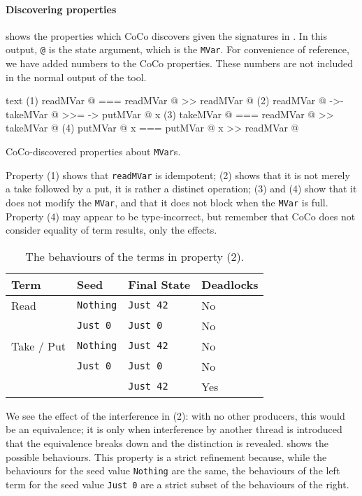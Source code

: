 \paragraph{Discovering properties}
 shows the properties which CoCo discovers given
the signatures in .  In this output, \verb|@| is the
state argument, which is the \verb|MVar|.  For convenience of
reference, we have added numbers to the CoCo properties.  These
numbers are not included in the normal output of the tool.

\begin{listing}
\centering
\begin{cminted}{text}
(1)   readMVar @  ===  readMVar @ >> readMVar @
(2)   readMVar @  ->-  takeMVar @ >>= \x -> putMVar @ x
(3)   takeMVar @  ===  readMVar @ >> takeMVar @
(4)  putMVar @ x  ===  putMVar @ x >> readMVar @
\end{cminted}
\caption{CoCo-discovered properties about \texttt{MVar}s.}\label{lst:mvar_props1}
\end{listing}

Property (1) shows that \verb|readMVar| is idempotent; (2) shows that
it is not merely a take followed by a put, it is rather a distinct
operation; (3) and (4) show that it does not modify the \verb|MVar|,
and that it does not block when the \verb|MVar| is full.  Property (4)
may appear to be type-incorrect, but remember that CoCo does not
consider equality of term results, only the effects.

\begin{table}[t]
\centering
\begin{tabular}{p{7.5em}p{7.5em}p{7.5em}p{7.5em}} \toprule
  Term       & Seed           & Final State & Deadlocks \\ \midrule
  Read       & \verb|Nothing| & \verb|Just 42| & No  \\
             & \verb|Just 0|  & \verb|Just 0|  & No  \\
  Take / Put & \verb|Nothing| & \verb|Just 42| & No  \\
             & \verb|Just 0|  & \verb|Just 0|  & No  \\
             &                & \verb|Just 42| & Yes \\ \bottomrule
\end{tabular}
\caption{The behaviours of the terms in property (2).}
\label{tbl:behaviours}
\end{table}

We see the effect of the interference in (2): with no other producers,
this would be an equivalence; it is only when interference by another
thread is introduced that the equivalence breaks down and the
distinction is revealed.   shows the possible
behaviours.  This property is a strict refinement because, while the
behaviours for the seed value \verb|Nothing| are the same, the
behaviours of the left term for the seed value \verb|Just 0| are a
strict subset of the behaviours of the right.

